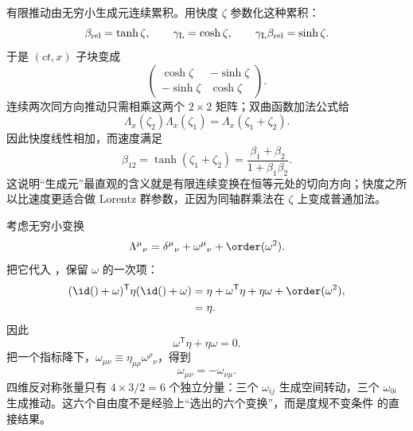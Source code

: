 \begin{exbox}[沿 $x$ 轴的有限推动]
有限推动由无穷小生成元连续累积。用快度 $\zeta$ 参数化这种累积：
\begin{equation}
 \beta_{\rm rel}=\tanh\zeta,
 \qquad
 \gamma_{\rm L}=\cosh\zeta,
 \qquad
 \gamma_{\rm L}\beta_{\rm rel}=\sinh\zeta.
 \label{eq:rapidity-definition-dp61}
\end{equation}
于是 $(ct,x)$ 子块变成
\begin{equation*}
 \begin{pmatrix}\cosh\zeta&-\sinh\zeta\\-\sinh\zeta&\cosh\zeta\end{pmatrix}.
\end{equation*}
连续两次同方向推动只需相乘这两个 $2\times2$ 矩阵；双曲函数加法公式给
\begin{equation*}
 \Lambda_x(\zeta_2)\Lambda_x(\zeta_1)
 =\Lambda_x(\zeta_1+\zeta_2).
\end{equation*}
因此快度线性相加，而速度满足
\begin{equation}
 \boxed{
 \beta_{12}
 =\tanh(\zeta_1+\zeta_2)
 =\frac{\beta_1+\beta_2}{1+\beta_1\beta_2}.}
 \label{eq:velocity-addition-dp61}
\end{equation}
这说明“生成元”最直观的含义就是有限连续变换在恒等元处的切向方向；快度之所以比速度更适合做 Lorentz 群参数，正因为同轴群乘法在 $\zeta$ 上变成普通加法。
\end{exbox}

考虑无穷小变换
\begin{equation*}
 \Lambda^\mu{}_{\nu}=\delta^\mu{}_{\nu}+\omega^\mu{}_{\nu}+\order(\omega^2).
\end{equation*}
把它代入 ，保留 $\omega$ 的一次项：
\begin{align*}
 (\id()+\omega)^{\mathsf T}\eta(\id()+\omega)
 &=\eta+\omega^{\mathsf T}\eta+\eta\omega+\order(\omega^2),\\
 &=\eta.
\end{align*}
因此
\begin{equation*}
 \omega^{\mathsf T}\eta+\eta\omega=0.
\end{equation*}
把一个指标降下，$\omega_{\mu\nu}\equiv\eta_{\mu\rho}\omega^\rho{}_{\nu}$，得到
\begin{equation}
 \omega_{\mu\nu}=-\omega_{\nu\mu}.
 \label{eq:omega-antisym}
\end{equation}
四维反对称张量只有 $4\times3/2=6$ 个独立分量：三个 $\omega_{ij}$ 生成空间转动，三个 $\omega_{0i}$ 生成推动。这六个自由度不是经验上“选出的六个变换”，而是度规不变条件  的直接结果。


